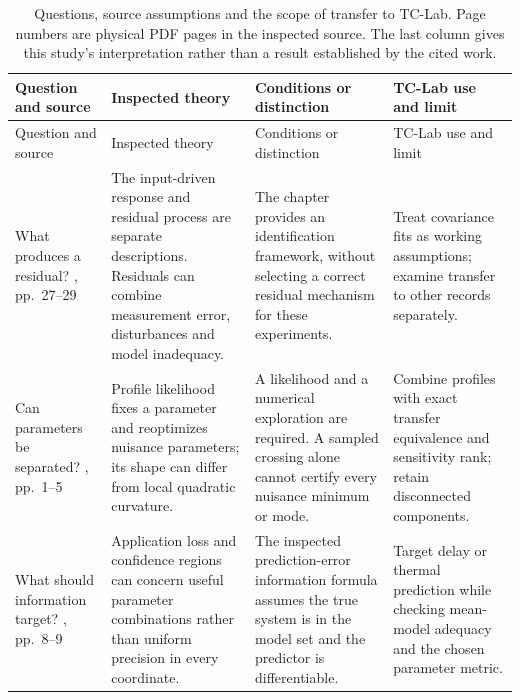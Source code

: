 \documentclass[11pt]{article}
\begin{document}
\begingroup
\small
\begin{longtable}{>{\raggedright\arraybackslash}p{.17\linewidth}>{\raggedright\arraybackslash}p{.25\linewidth}>{\raggedright\arraybackslash}p{.25\linewidth}>{\raggedright\arraybackslash}p{.19\linewidth}}
 \caption{Questions, source assumptions and the scope of transfer to TC-Lab.
 Page numbers are physical PDF pages in the inspected source. The last column
 gives this study's interpretation rather than a result established by the
 cited work.}\label{tab:literature-comparison}\\
 \toprule
 Question and source & Inspected theory & Conditions or distinction & TC-Lab use and limit \\
 \midrule
 \endfirsthead
 \toprule
 Question and source & Inspected theory & Conditions or distinction & TC-Lab use and limit \\
 \midrule
 \endhead
 \bottomrule
 \endfoot
 What produces a residual?\newline
 \citet{garnier-2008-direct}, pp.~27--29
 & The input-driven response and residual process are separate descriptions.
 Residuals can combine measurement error, disturbances and model inadequacy.
 & The chapter provides an identification framework, without selecting a
 correct residual mechanism for these experiments.
 & Treat covariance fits as working assumptions; examine transfer to other
 records separately. \\[.6em]

 Can parameters be separated?\newline
 \citet{raue-2009-structural}, pp.~1--5
 & Profile likelihood fixes a parameter and reoptimizes nuisance parameters;
 its shape can differ from local quadratic curvature.
 & A likelihood and a numerical exploration are required. A sampled crossing
 alone cannot certify every nuisance minimum or mode.
 & Combine profiles with exact transfer equivalence and sensitivity rank;
 retain disconnected components. \\[.6em]

 What should information target?\newline
 \citet{hjalmarsson-2009-system}, pp.~8--9
 & Application loss and confidence regions can concern useful parameter
 combinations rather than uniform precision in every coordinate.
 & The inspected prediction-error information formula assumes the true system
 is in the model set and the predictor is differentiable.
 & Target delay or thermal prediction while checking mean-model adequacy and
 the chosen parameter metric. \\[.6em]


\end{longtable}
\end{document}
